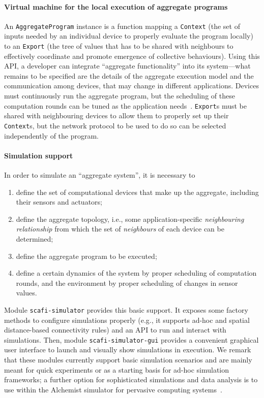 \paragraph*{Virtual machine for the local execution of aggregate programs}
%
An \texttt{AggregateProgram} instance 
 is a function
 mapping a \texttt{Context}
 (the set of inputs needed by an individual device
  to properly evaluate the program locally)
 to an \texttt{Export}
 (the tree of values that has to be shared 
  with neighbours to effectively coordinate and promote 
  emergence of collective behaviours).
%
Using this API,
 a developer can 
 integrate ``aggregate functionality''
 into its system---what remains to be specified are the
 details of the aggregate execution model and the communication among devices,
 that may change in different applications.
%
Devices must continuously run the aggregate program,
but the scheduling of these computation rounds can be tuned
as the application needs~\cite{DBLP:journals/lmcs/PianiniCVMZ21}.
%
\texttt{Export}s must be shared with neighbouring devices to allow them
to properly set up their \texttt{Context}s,
but the network protocol to be used to do so can be selected
independently of the program.
 
\paragraph*{Simulation support}
%
In order to simulate an ``aggregate system'',
 it is necessary 
 to 
\begin{enumerate}
  \item define the set of computational devices that make up the aggregate, including their sensors and actuators;
  \item define the aggregate topology, i.e., 
  some application-specific \emph{neighbouring relationship}
  from which the set of \emph{neighbours}
  of each device can be determined;
  \item define the aggregate program to be executed;
  \item define a certain dynamics of the system
  by proper scheduling of computation rounds,
  and the environment
  by proper scheduling of changes in sensor values.
\end{enumerate}

%
Module \texttt{scafi-simulator}
 provides this basic support.
%
It exposes some factory methods
to configure simulations properly
 (e.g., it supports ad-hoc and spatial distance-based connectivity rules)
 and an API to run and interact with simulations.
%
Then, module \texttt{scafi-simulator-gui}
 provides a convenient graphical user interface
 to launch and visually show simulations in execution.
%
We remark that these modules
 currently support basic simulation scenarios
 and are mainly meant for quick experiments
 or as a starting basis for ad-hoc simulation frameworks;
 a further option for sophisticated simulations and data analysis is to use \scafi{} within the Alchemist simulator for pervasive computing systems~\cite{alchemist,scafi-alchemist}.
 
